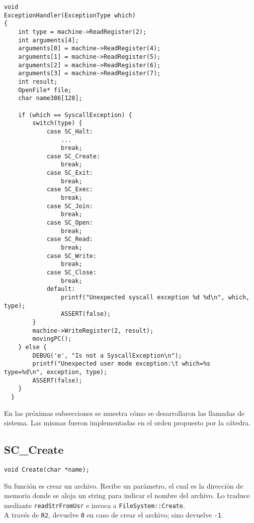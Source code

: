 \begin{lstlisting}[style=C]
void
ExceptionHandler(ExceptionType which)
{
    int type = machine->ReadRegister(2);
    int arguments[4];
    arguments[0] = machine->ReadRegister(4);
    arguments[1] = machine->ReadRegister(5);
    arguments[2] = machine->ReadRegister(6);
    arguments[3] = machine->ReadRegister(7);
    int result;
    OpenFile* file;
    char name386[128];

    if (which == SyscallException) {
    	switch(type) {
            case SC_Halt:
                ...
                break;
            case SC_Create:
                break;
            case SC_Exit:
                break;
            case SC_Exec:
                break;
            case SC_Join:
                break;
            case SC_Open:
                break;
            case SC_Read:
                break;
            case SC_Write:
                break;
            case SC_Close:
                break;
            default: 
                printf("Unexpected syscall exception %d %d\n", which, type);
                ASSERT(false);
    	}
        machine->WriteRegister(2, result);
    	movingPC();
    } else {
        DEBUG('e', "Is not a SyscallException\n");
        printf("Unexpected user mode exception:\t which=%s  type=%d\n", exception, type);
        ASSERT(false);
    }
  }
\end{lstlisting}

En las próximas subsecciones se muestra cómo se desarrollaron las llamadas de sistema. Las mismas fueron implementadas en el orden propuesto por la cátedra.\\
\subsection*{SC\_Create}
\begin{lstlisting}[style=C]
void Create(char *name);
\end{lstlisting}
Su función es crear un archivo. Recibe un parámetro, el cual es la dirección de memoria donde se aloja un string para indicar el nombre del archivo. Lo traduce mediante \texttt{readStrFromUsr} e invoca a \texttt{FileSystem::Create}.\\
A través de \texttt{R2}, devuelve \texttt{0} en caso de crear el archivo; sino devuelve \texttt{-1}.
